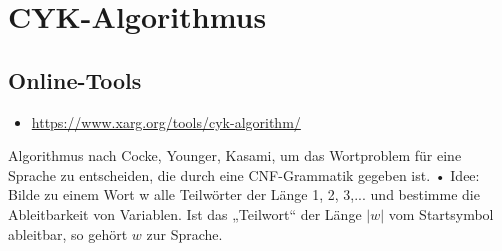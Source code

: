 \documentclass{lehramt-informatik-haupt}
\begin{document}
\let\schrittE=\liChomskyUeberErklaerung

\chapter{CYK-Algorithmus}

\begin{liQuellen}
\item \cite[Seite 45-75]{theo:fs:2}
\item \cite[Seite 186-188]{hoffmann}
\item \cite{wiki:cyk}
\end{liQuellen}

\section{Online-Tools}

\begin{itemize}
\item \url{https://www.xarg.org/tools/cyk-algorithm/}
\end{itemize}

Algorithmus nach Cocke, Younger, Kasami, um das Wortproblem für
eine Sprache zu entscheiden, die durch eine CNF-Grammatik
gegeben ist.
• Idee:
Bilde zu einem Wort w alle Teilwörter der Länge 1, 2, 3,... und
bestimme die Ableitbarkeit von Variablen.
Ist das „Teilwort“ der Länge $|w|$ vom Startsymbol ableitbar, so gehört
$w$ zur Sprache.

\literatur
\end{document}
